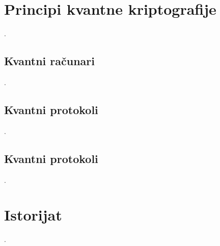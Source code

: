 \documentclass[a4paper]{article}
\begin{document}
{\section{Principi kvantne kriptografije}
.
\subsection{Kvantni računari}
.
\subsection{Kvantni protokoli}
.
\subsection{Kvantni protokoli}
.
\section{Istorijat}	
\label{sec:termini_i_citiranje}

.
}
\end{document}
